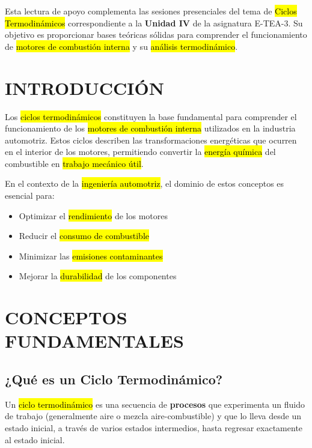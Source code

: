 \documentclass{article}
\begin{document}

Esta lectura de apoyo complementa las sesiones presenciales del tema de \hl{Ciclos Termodinámicos} correspondiente a la \textbf{Unidad IV} de la asignatura E-TEA-3. Su objetivo es proporcionar bases teóricas sólidas para comprender el funcionamiento de \hl{motores de combustión interna} y su \hl{análisis termodinámico}.

\vspace{5mm}

\section*{INTRODUCCIÓN}

Los \hl{ciclos termodinámicos} constituyen la base fundamental para comprender el funcionamiento de los \hl{motores de combustión interna} utilizados en la industria automotriz. Estos ciclos describen las transformaciones energéticas que ocurren en el interior de los motores, permitiendo convertir la \hl{energía química} del combustible en \hl{trabajo mecánico útil}.

En el contexto de la \hl{ingeniería automotriz}, el dominio de estos conceptos es esencial para:
\begin{itemize}
    \item Optimizar el \hl{rendimiento} de los motores
    \item Reducir el \hl{consumo de combustible}
    \item Minimizar las \hl{emisiones contaminantes}
    \item Mejorar la \hl{durabilidad} de los componentes
\end{itemize}

\vspace{5mm}

\section*{CONCEPTOS FUNDAMENTALES}

\subsection*{¿Qué es un Ciclo Termodinámico?}

Un \hl{ciclo termodinámico} es una secuencia de \textbf{procesos} que experimenta un fluido de trabajo (generalmente aire o mezcla aire-combustible) y que lo lleva desde un estado inicial, a través de varios estados intermedios, hasta regresar exactamente al estado inicial.
\end{document}
